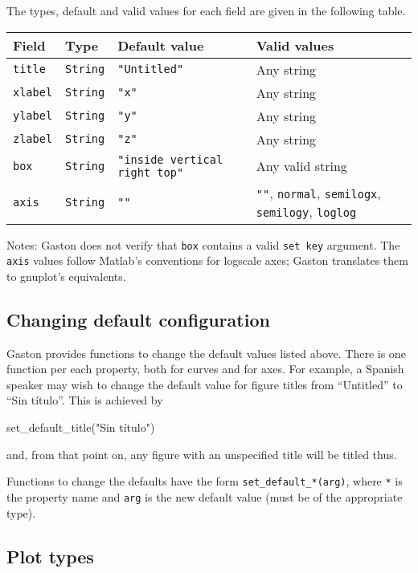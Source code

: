 \documentclass[11pt]{article}
\newcommand{\cmd}[1]{\texttt{#1}}
\begin{document}
The types, default and valid values for each field are given in the following
table.

{\small
\begin{center}
	\begin{tabular}{lp{1.5cm}p{2cm}p{7.5cm}}
	\toprule
	\textbf{Field} & \textbf{Type} & \textbf{Default value} & \textbf{Valid values} \\
	\midrule
	\cmd{title} & \cmd{String} & \cmd{"Untitled"} & Any string \\
	\cmd{xlabel} & \cmd{String} & \cmd{"x"} & Any string \\
	\cmd{ylabel} & \cmd{String} & \cmd{"y"} & Any string \\
	\cmd{zlabel} & \cmd{String} & \cmd{"z"} & Any string \\
	\cmd{box} & \cmd{String} & \cmd{"inside vertical right top"} & Any valid
	string \\
	\cmd{axis} & \cmd{String} & \cmd{""} & \cmd{""}, \cmd{normal},
	\cmd{semilogx}, \cmd{semilogy}, \cmd{loglog}  \\
	\bottomrule
\end{tabular}
\end{center}}

Notes: Gaston does not verify that \cmd{box} contains a valid \cmd{set key}
argument. The \cmd{axis} values follow Matlab's conventions for logscale axes;
Gaston translates them to gnuplot's equivalents.

\subsection{Changing default configuration}

Gaston provides functions to change the default values listed above. There is
one function per each property, both for curves and for axes. For example, a
Spanish speaker may wish to change the default value for figure titles from
``Untitled'' to ``Sin título''. This is achieved by
\begin{juliacode}
set_default_title("Sin título")
\end{juliacode}
and, from that point on, any figure with an unspecified title will be titled
thus.

Functions to change the defaults have the form \cmd{set\_default\_*(arg)},
where \texttt{*} is the property name and \cmd{arg} is the new default
value (must be of the appropriate type).

\subsection{Plot types}
\end{document}
